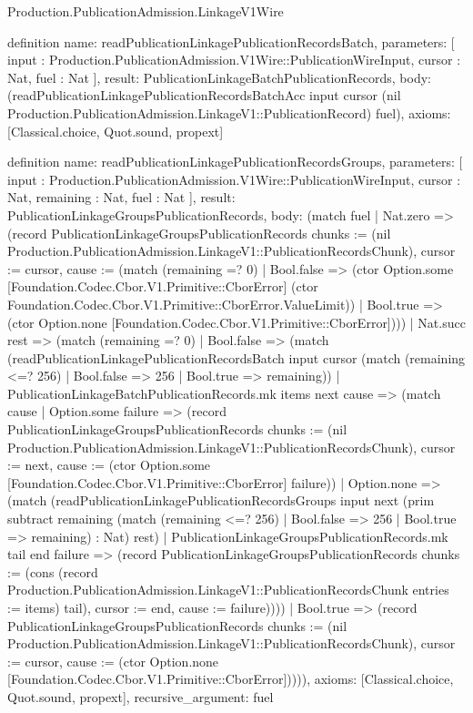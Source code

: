 \begin{lexlean}{Production.PublicationAdmission.LinkageV1Wire}
\begin{semanticmodule}
definition{
  name: readPublicationLinkagePublicationRecordsBatch,
  parameters: [
    input : Production.PublicationAdmission.V1Wire::PublicationWireInput,
    cursor : Nat,
    fuel : Nat
  ],
  result: PublicationLinkageBatchPublicationRecords,
  body: (readPublicationLinkagePublicationRecordsBatchAcc input cursor (nil Production.PublicationAdmission.LinkageV1::PublicationRecord) fuel),
  axioms: [Classical.choice, Quot.sound, propext]
}

definition{
  name: readPublicationLinkagePublicationRecordsGroups,
  parameters: [
    input : Production.PublicationAdmission.V1Wire::PublicationWireInput,
    cursor : Nat,
    remaining : Nat,
    fuel : Nat
  ],
  result: PublicationLinkageGroupsPublicationRecords,
  body: (match fuel
    | Nat.zero => (record PublicationLinkageGroupsPublicationRecords {chunks := (nil Production.PublicationAdmission.LinkageV1::PublicationRecordsChunk), cursor := cursor, cause := (match (remaining =? 0)
      | Bool.false => (ctor Option.some [Foundation.Codec.Cbor.V1.Primitive::CborError] (ctor Foundation.Codec.Cbor.V1.Primitive::CborError.ValueLimit))
      | Bool.true => (ctor Option.none [Foundation.Codec.Cbor.V1.Primitive::CborError]))})
    | Nat.succ rest => (match (remaining =? 0)
      | Bool.false => (match (readPublicationLinkagePublicationRecordsBatch input cursor (match (remaining <=? 256)
          | Bool.false => 256
          | Bool.true => remaining))
        | PublicationLinkageBatchPublicationRecords.mk items next cause => (match cause
          | Option.some failure => (record PublicationLinkageGroupsPublicationRecords {chunks := (nil Production.PublicationAdmission.LinkageV1::PublicationRecordsChunk), cursor := next, cause := (ctor Option.some [Foundation.Codec.Cbor.V1.Primitive::CborError] failure)})
          | Option.none => (match (readPublicationLinkagePublicationRecordsGroups input next (prim subtract remaining (match (remaining <=? 256)
              | Bool.false => 256
              | Bool.true => remaining) : Nat) rest)
            | PublicationLinkageGroupsPublicationRecords.mk tail end failure => (record PublicationLinkageGroupsPublicationRecords {chunks := (cons (record Production.PublicationAdmission.LinkageV1::PublicationRecordsChunk {entries := items}) tail), cursor := end, cause := failure}))))
      | Bool.true => (record PublicationLinkageGroupsPublicationRecords {chunks := (nil Production.PublicationAdmission.LinkageV1::PublicationRecordsChunk), cursor := cursor, cause := (ctor Option.none [Foundation.Codec.Cbor.V1.Primitive::CborError])}))),
  axioms: [Classical.choice, Quot.sound, propext],
  recursive_argument: fuel
}


\end{semanticmodule}
\end{lexlean}
